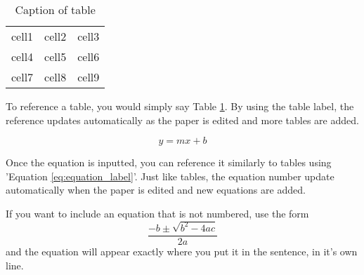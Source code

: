 \documentclass{article}
\begin{document}

\begin{table}[!tb] %
    \begin{center}
        \begin{tabular}{ |c|c|c| } 
            \hline
            cell1 & cell2 & cell3 \\ 
            cell4 & cell5 & cell6 \\ 
            cell7 & cell8 & cell9 \\ 
            \hline
        \end{tabular}
        \caption{Caption of table} %
        \label{table:label_of_table} %
    \end{center}
\end{table}

\par To reference a table, you would simply say Table \ref{table:label_of_table}. By using the table label, the reference updates automatically as the paper is edited and more tables are added.




\begin{equation} 
    y=mx+b
    \label{eq:equation_label}
\end{equation}

\par Once the equation is inputted, you can reference it similarly to tables using 'Equation \ref{eq:equation_label}'. Just like tables, the equation number update automatically when the paper is edited and new equations are added. 

\par If you want to include an equation that is not numbered, use the form $$\frac{-b\pm \sqrt{b^{2}-4ac}}{2a}$$ and the equation will appear exactly where you put it in the sentence, in it's own line. 
\end{document}
